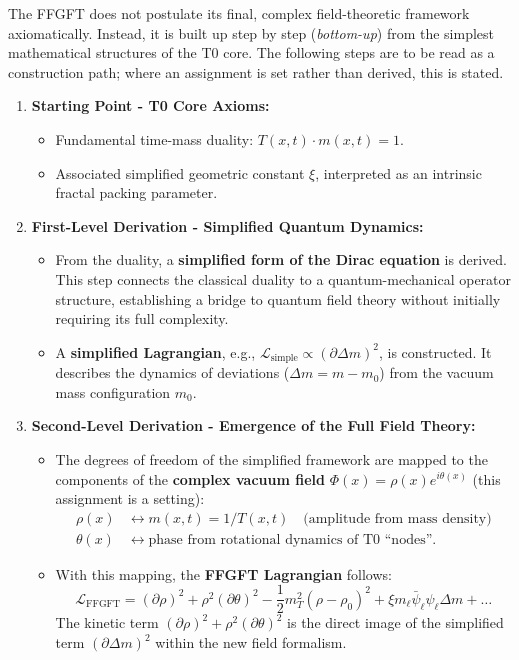 	The FFGFT does not postulate its final, complex field-theoretic framework axiomatically. Instead, it is built up step by step (\emph{bottom-up}) from the simplest mathematical structures of the T0 core. The following steps are to be read as a construction path; where an assignment is set rather than derived, this is stated.
	
	\begin{enumerate}
		\item \textbf{Starting Point - T0 Core Axioms:}
		\begin{itemize}
			\item Fundamental time-mass duality: \( T(x,t) \cdot m(x,t) = 1 \).
			\item Associated simplified geometric constant \( \xi \), interpreted as an intrinsic fractal packing parameter.
		\end{itemize}
		
		\item \textbf{First-Level Derivation - Simplified Quantum Dynamics:}
		\begin{itemize}
			\item From the duality, a \textbf{simplified form of the Dirac equation} is derived. This step connects the classical duality to a quantum-mechanical operator structure, establishing a bridge to quantum field theory without initially requiring its full complexity.
			\item A \textbf{simplified Lagrangian}, e.g., \( \mathcal{L}_{\text{simple}} \propto (\partial \Delta m)^2 \), is constructed. It describes the dynamics of deviations (\( \Delta m = m - m_0 \)) from the vacuum mass configuration \( m_0 \).
		\end{itemize}
		
		\item \textbf{Second-Level Derivation - Emergence of the Full Field Theory:}
		\begin{itemize}
			\item The degrees of freedom of the simplified framework are mapped to the components of the \textbf{complex vacuum field} \( \Phi(x) = \rho(x) e^{i\theta(x)} \) (this assignment is a setting):
			\begin{align*}
				\rho(x) &\leftrightarrow m(x,t) = 1/T(x,t) \quad \text{(amplitude from mass density)} \\
				\theta(x) &\leftrightarrow \text{phase from rotational dynamics of T0 ``nodes''}.
			\end{align*}
			\item With this mapping, the \textbf{FFGFT Lagrangian} follows:
			\[
			\mathcal{L}_{\text{FFGFT}} = (\partial \rho)^2 + \rho^2 (\partial \theta)^2 - \frac{1}{2} m_T^2 (\rho - \rho_0)^2 + \xi m_\ell \bar{\psi}_\ell \psi_\ell \Delta m + \dots
			\]
			The kinetic term \( (\partial \rho)^2 + \rho^2 (\partial \theta)^2 \) is the direct image of the simplified term \( (\partial \Delta m)^2 \) within the new field formalism.
		\end{itemize}
	\end{enumerate}
	
